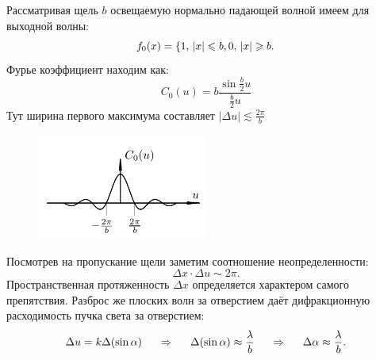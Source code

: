 Рассматривая щель $b$ освещаемую нормально падающей волной имеем для выходной волны:
\begin{equation*}
	f_0(x) = \left\{
	1, \, |x| \leq b,\\
	0, \, |x| \geq b.
	\right.
\end{equation*}
Фурье коэффициент находим как:
\begin{equation*}
	C_0(u) = b \frac{\sin \frac{b}{2}u}{\frac{b}{2}u}
\end{equation*}
Тут ширина первого максимума составляет $|\Delta u|\lesssim \frac{2 \pi}{b}$
\begin{figure}[h]
    \centering
    \includegraphics[width=0.5\textwidth]{figures/328.png}
\end{figure}
Посмотрев на пропускание щели заметим соотношение неопределенности:
\begin{equation*}
	\Delta x \cdot \Delta u \sim 2 \pi.
\end{equation*}
Пространственная протяженность $\Delta x$ определяется характером самого препятствия. Разброс же плоских волн за отверстием даёт дифракционную расходимость пучка света за отверстием:
\begin{equation*}
	\Delta u = k \Delta(\sin \alpha)
	\hspace{0.5 cm}
	\Rightarrow
	\hspace{0.5 cm}
	\Delta(\sin \alpha) \approx \frac{\lambda}{b}
	\hspace{0.5 cm}
	\Rightarrow
	\hspace{0.5 cm}
	\Delta \alpha \approx \frac{\lambda}{b}.
\end{equation*}
